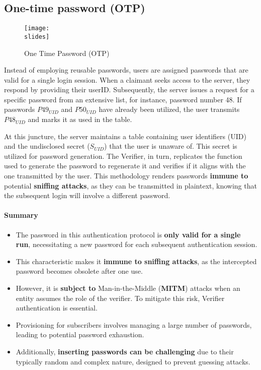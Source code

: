 \subsection{One-time password (OTP)}
\begin{figure}[h]
  \centering
  \texttt{[image: \\slides]}
  \caption{One Time Password (OTP)}
\end{figure}
Instead of employing reusable passwords, users are assigned passwords that are valid for a single login session. When a claimant seeks access to the server, they respond by providing their userID. Subsequently, the server issues a request for a specific password from an extensive list, for instance, password number 48. If passwords $P49_{UID}$ and $P50_{UID}$ have already been utilized, the user transmits $P48_{UID}$ and marks it as used in the table.

At this juncture, the server maintains a table containing user identifiers (UID) and the undisclosed secret ($S_{UID}$) that the user is unaware of.
This secret is utilized for password generation. The Verifier, in turn, replicates the function used to generate the password to regenerate it and verifies if it aligns with the one transmitted by the user. This methodology renders passwords \textbf{immune to} potential \textbf{sniffing attacks}, as they can be transmitted in plaintext, knowing that the subsequent login will involve a different password.

\paragraph*{Summary}
\begin{itemize}
  \item The password in this authentication protocol is \textbf{only valid for a single run}, necessitating a new password for each subsequent authentication session.
  \item This characteristic makes it \textbf{immune to sniffing attacks}, as the intercepted password becomes obsolete after one use.
  \item However, it is \textbf{subject to} Man-in-the-Middle (\textbf{MITM}) attacks when an entity assumes the role of the verifier. To mitigate this risk, Verifier authentication is essential.
  \item Provisioning for subscribers involves managing a large number of passwords, leading to potential password exhaustion.
  \item Additionally, \textbf{inserting passwords can be challenging} due to their typically random and complex nature, designed to prevent guessing attacks.
\end{itemize}

